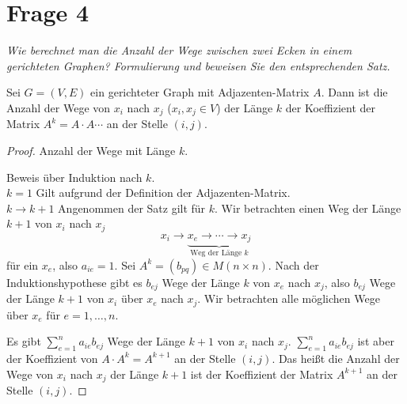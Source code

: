 \section{Frage 4}
\textit{Wie berechnet man die Anzahl der Wege zwischen zwei Ecken in
einem gerichteten Graphen? Formulierung und beweisen Sie den entsprechenden
Satz.}

\begin{theorem}
    Sei $G=(V,E)$ ein gerichteter Graph mit Adjazenten-Matrix $A$. Dann ist
    die Anzahl der Wege von $x_i$ nach $x_j$ ($x_i,x_j\in V$) der Länge $k$
    der Koeffizient der Matrix $A^k=A\cdot A \cdots$ an der Stelle $(i,j)$.
\end{theorem}

\begin{proof}
    Anzahl der Wege mit Länge $k$.

    Beweis über Induktion nach $k$.\\
    \underline{$k = 1$} Gilt aufgrund der Definition der Adjazenten-Matrix.\\
    \underline{$k \to k + 1$} Angenommen der Satz gilt für $k$. Wir betrachten
    einen Weg der Länge $k+1$ von $x_i$ nach $x_j$
    \[
        x_i \to \underbrace{x_e \to \cdots \to x_j}_{\text{Weg der Länge }k}  
    \]
    für ein $x_e$, also $a_{ie} = 1$. Sei $A^k=(b_{pq})\in M(n\times n)$.
    Nach der Induktionshypothese gibt es $b_{ej}$ Wege der Länge $k$ von 
    $x_e$ nach $x_j$, also $b_{ej}$ Wege der Länge $k+1$ von $x_i$ 
    über $x_e$ nach $x_j$. Wir betrachten alle möglichen Wege über $x_e$ für
    $e=1,\dots,n$.

    Es gibt $\sum_{e=1}^{n}a_{ie}b_{ej}$ Wege der Länge $k+1$ von $x_i$ nach
    $x_j$. $\sum_{e=1}^{n}a_{ie}b_{ej}$ ist aber der Koeffizient von
    $A\cdot A^k=A^{k+1}$ an der Stelle $(i,j)$. Das heißt die Anzahl der Wege
    von $x_i$ nach $x_j$ der Länge $k+1$ ist der Koeffizient der Matrix
    $A^{k+1}$ an der Stelle $(i,j)$.
\end{proof}